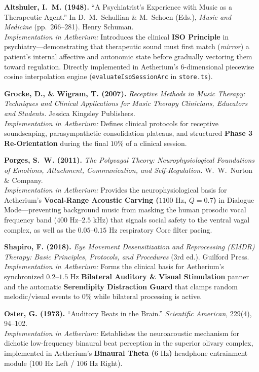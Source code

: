 \documentclass[11pt,oneside,openany]{book}
\begin{document}
\begin{enumerate}[label=\textbf{[\arabic*]}, resume]
  \item \textbf{Altshuler, I.\ M. (1948).} ``A Psychiatrist's Experience with Music as a Therapeutic Agent.'' In D.\ M.\ Schullian \& M.\ Schoen (Eds.), \textit{Music and Medicine} (pp.\ 266--281). Henry Schuman.\\
  \textit{Implementation in Aetherium:} Introduces the clinical \textbf{ISO Principle} in psychiatry---demonstrating that therapeutic sound must first match (\textit{mirror}) a patient's internal affective and autonomic state before gradually vectoring them toward regulation. Directly implemented in Aetherium's 6-dimensional piecewise cosine interpolation engine (\texttt{evaluateIsoSessionArc} in \texttt{store.ts}).

  \item \textbf{Grocke, D., \& Wigram, T. (2007).} \textit{Receptive Methods in Music Therapy: Techniques and Clinical Applications for Music Therapy Clinicians, Educators and Students.} Jessica Kingsley Publishers.\\
  \textit{Implementation in Aetherium:} Defines clinical protocols for receptive soundscaping, parasympathetic consolidation plateaus, and structured \textbf{Phase 3 Re-Orientation} during the final $10\%$ of a clinical session.

  \item \textbf{Porges, S.\ W. (2011).} \textit{The Polyvagal Theory: Neurophysiological Foundations of Emotions, Attachment, Communication, and Self-Regulation.} W.\ W.\ Norton \& Company.\\
  \textit{Implementation in Aetherium:} Provides the neurophysiological basis for Aetherium's \textbf{Vocal-Range Acoustic Carving ($1100\text{ Hz}$, $Q=0.7$)} in Dialogue Mode---preventing background music from masking the human prosodic vocal frequency band ($400\text{ Hz} \text{--} 2.5\text{ kHz}$) that signals social safety to the ventral vagal complex, as well as the $0.05\text{--}0.15\text{ Hz}$ respiratory Core filter pacing.

  \item \textbf{Shapiro, F. (2018).} \textit{Eye Movement Desensitization and Reprocessing (EMDR) Therapy: Basic Principles, Protocols, and Procedures} (3rd ed.). Guilford Press.\\
  \textit{Implementation in Aetherium:} Forms the clinical basis for Aetherium's synchronized $0.2\text{--}1.5\text{ Hz}$ \textbf{Bilateral Auditory \& Visual Stimulation} panner and the automatic \textbf{Serendipity Distraction Guard} that clamps random melodic/visual events to $0\%$ while bilateral processing is active.

  \item \textbf{Oster, G. (1973).} ``Auditory Beats in the Brain.'' \textit{Scientific American}, 229(4), 94--102.\\
  \textit{Implementation in Aetherium:} Establishes the neuroacoustic mechanism for dichotic low-frequency binaural beat perception in the superior olivary complex, implemented in Aetherium's \textbf{Binaural Theta ($6\text{ Hz}$)} headphone entrainment module ($100\text{ Hz}$ Left / $106\text{ Hz}$ Right).
\end{enumerate}
\end{document}
